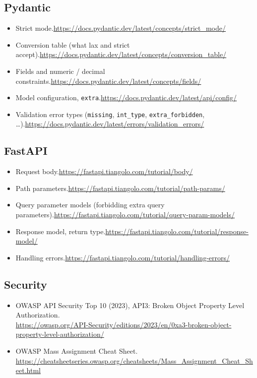 \documentclass[11pt,a4paper]{article}
\newcommand{\code}[1]{\texttt{#1}}
\begin{document}
\subsection*{Pydantic}
\begin{itemize}
  \item Strict mode.\quad \url{https://docs.pydantic.dev/latest/concepts/strict_mode/}
  \item Conversion table (what lax and strict accept).\quad \url{https://docs.pydantic.dev/latest/concepts/conversion_table/}
  \item Fields and numeric / decimal constraints.\quad \url{https://docs.pydantic.dev/latest/concepts/fields/}
  \item Model configuration, \code{extra}.\quad \url{https://docs.pydantic.dev/latest/api/config/}
  \item Validation error types (\code{missing}, \code{int\_type}, \code{extra\_forbidden}, \ldots).\quad \url{https://docs.pydantic.dev/latest/errors/validation_errors/}
\end{itemize}

\subsection*{FastAPI}
\begin{itemize}
  \item Request body.\quad \url{https://fastapi.tiangolo.com/tutorial/body/}
  \item Path parameters.\quad \url{https://fastapi.tiangolo.com/tutorial/path-params/}
  \item Query parameter models (forbidding extra query parameters).\quad \url{https://fastapi.tiangolo.com/tutorial/query-param-models/}
  \item Response model, return type.\quad \url{https://fastapi.tiangolo.com/tutorial/response-model/}
  \item Handling errors.\quad \url{https://fastapi.tiangolo.com/tutorial/handling-errors/}
\end{itemize}

\subsection*{Security}
\begin{itemize}
  \item OWASP API Security Top 10 (2023), API3: Broken Object Property Level Authorization.\\
    \url{https://owasp.org/API-Security/editions/2023/en/0xa3-broken-object-property-level-authorization/}
  \item OWASP Mass Assignment Cheat Sheet.\\
    \url{https://cheatsheetseries.owasp.org/cheatsheets/Mass_Assignment_Cheat_Sheet.html}
\end{itemize}
\end{document}
